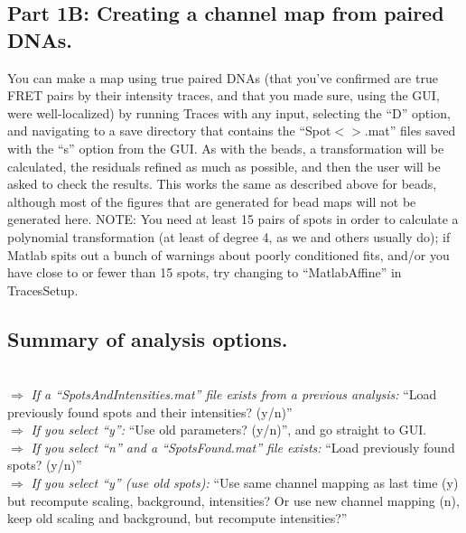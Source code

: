 \documentclass[11pt]{article}
\begin{document}
\subsection{Part 1B: Creating a channel map from paired DNAs.}

You can make a map using true paired DNAs (that you've confirmed are true FRET pairs by their intensity traces, and that you made sure, using the GUI, were well-localized) by running Traces with any input,  selecting the ``D'' option, and navigating to a save directory that contains the ``Spot$<$$>$.mat'' files saved with the ``s'' option from the GUI.  As with the beads, a transformation will be calculated, the residuals refined as much as possible, and then the user will be asked to check the results.  This works the same as described above for beads, although most of the figures that are generated for bead maps will not be generated here.   NOTE: You need at least 15 pairs of spots in order to calculate a polynomial transformation (at least of degree 4, as we and others usually do); if Matlab spits out a bunch of warnings about poorly conditioned fits, and/or you have close to or fewer than 15 spots, try changing to ``MatlabAffine'' in TracesSetup.

\newpage

\subsection{Summary of analysis options.}\label{sec:AnalysisOptions}

\\

\noindent $\Rightarrow$ {\it If a ``SpotsAndIntensities.mat'' file exists from a previous analysis:} ``Load previously found spots and their intensities? (y/n)''  \\

$\Rightarrow$ {\it If you select ``y'':} ``Use old parameters? (y/n)'', and go straight to GUI.\\

$\Rightarrow$ {\it If you select ``n'' and a ``SpotsFound.mat'' file exists:} ``Load previously found spots? (y/n)''  \\

\indent\indent $\Rightarrow$ {\it If you select ``y'' (use old spots):} ``Use same channel mapping as last time (y) but recompute scaling, background, intensities?  Or use new channel mapping (n), keep old scaling and background, but recompute intensities?''\\
\end{document}
